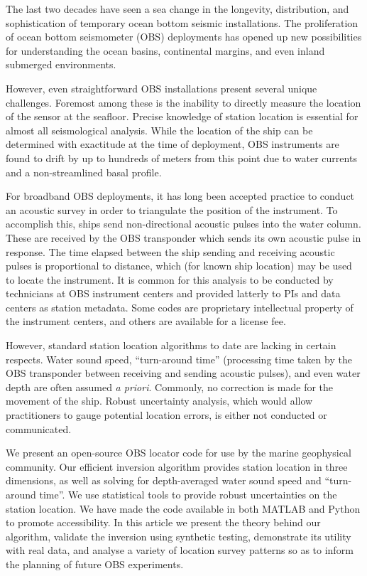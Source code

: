 The last two decades have seen a sea change in the longevity, distribution, and sophistication of temporary ocean bottom seismic installations. The proliferation of ocean bottom seismometer (OBS) deployments has opened up new possibilities for understanding the ocean basins, continental margins, and even inland submerged environments. 

However, even straightforward OBS installations present several unique challenges. Foremost among these is the inability to directly measure the location of the sensor at the seafloor. Precise knowledge of station location is essential for almost all seismological analysis. While the location of the ship can be determined with exactitude at the time of deployment, OBS instruments are found to drift by up to hundreds of meters from this point due to water currents and a non-streamlined  basal profile. 

For broadband OBS deployments, it has long been accepted practice to conduct an acoustic survey in order to triangulate the position of the instrument. To accomplish this, ships send non-directional acoustic pulses into the water column. These are received by the OBS transponder which sends its own acoustic pulse in response. The time elapsed between the ship sending and receiving acoustic pulses is proportional to distance, which (for known ship location) may be used to locate the instrument. It is common for this analysis to be conducted by technicians at OBS instrument centers and provided latterly to PIs and data centers as station metadata. Some codes are proprietary intellectual property of the instrument centers, and others are available for a license fee. 

However, standard station location algorithms to date are lacking in certain respects. Water sound speed, ``turn-around time'' (processing time taken by the OBS transponder between receiving and sending acoustic pulses), and even water depth are often assumed \textit{a priori}. Commonly, no correction is made for the movement of the ship. Robust uncertainty analysis, which would allow practitioners to gauge potential location errors, is either not conducted or communicated. 

We present an open-source OBS locator code for use by the marine geophysical community. Our efficient inversion algorithm provides station location in three dimensions, as well as solving for depth-averaged water sound speed and ``turn-around time''. We use statistical tools to provide robust uncertainties on the station location. We have made the code available in both MATLAB and Python to promote accessibility. In this article we present the theory behind our algorithm, validate the inversion using synthetic testing, demonstrate its utility with real data, and analyse a variety of location survey patterns so as to inform the planning of future OBS experiments. 
